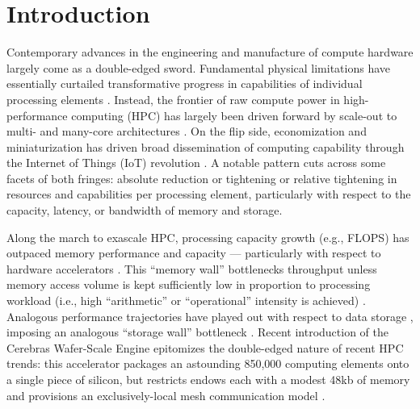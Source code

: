 \section{Introduction} \label{sec:introduction}

Contemporary advances in the engineering and manufacture of compute hardware largely come as a double-edged sword.
Fundamental physical limitations have essentially curtailed transformative progress in capabilities of individual processing elements \citep{sutter2005free}.
Instead, the frontier of raw compute power in high-performance computing (HPC) has largely been driven forward by scale-out to multi- and many-core architectures \citep{morgenstern2021unparalleled}.
On the flip side, economization and miniaturization has driven broad dissemination of computing capability through the Internet of Things (IoT) revolution \citep{rfc7228,ojo2018review}.
A notable pattern cuts across some facets of both fringes: absolute reduction or tightening or relative tightening in resources and capabilities per processing element, particularly with respect to the capacity, latency, or bandwidth of memory and storage.

Along the march to exascale HPC, processing capacity growth (e.g., FLOPS) has outpaced memory performance and capacity --- particularly with respect to hardware accelerators \citep{kogge2013exascale,khan2021analysis}.
This ``memory wall'' bottlenecks throughput unless memory access volume is kept sufficiently low in proportion to processing workload (i.e., high ``arithmetic'' or ``operational'' intensity is achieved) \citep{obviousmemorywall,mckee2004reflections,ROOFLINEMODEL2008Berkley}.
Analogous performance trajectories have played out with respect to data storage \citep{heldens2020landscape,kunkel2014exascale}, imposing an analogous ``storage wall'' bottleneck \citep{hu2016storage}.
Recent introduction of the Cerebras Wafer-Scale Engine epitomizes the double-edged nature of recent HPC trends: this accelerator packages an astounding 850,000 computing elements onto a single piece of silicon, but restricts endows each with a modest 48kb of memory and provisions an exclusively-local mesh communication model \citep{cerebras2021wafer,lauterbach2021path}.

